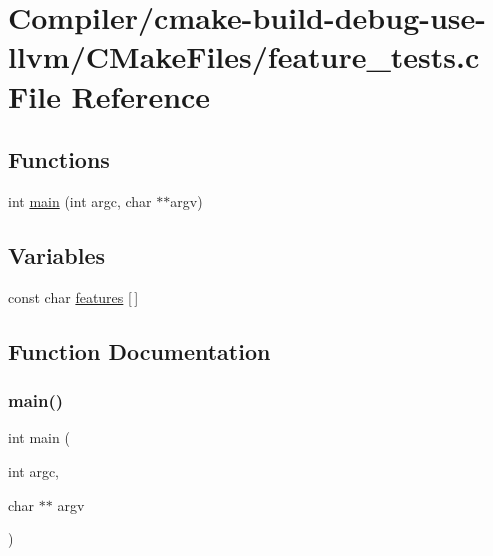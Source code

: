 \hypertarget{_compiler_2cmake-build-debug-use-llvm_2_c_make_files_2feature__tests_8c}{}\section{Compiler/cmake-\/build-\/debug-\/use-\/llvm/\+C\+Make\+Files/feature\+\_\+tests.c File Reference}
\label{_compiler_2cmake-build-debug-use-llvm_2_c_make_files_2feature__tests_8c}
\subsection*{Functions}
\begin{DoxyCompactItemize}
\item 
int \mbox{\hyperlink{_compiler_2cmake-build-debug-use-llvm_2_c_make_files_2feature__tests_8c_a3c04138a5bfe5d72780bb7e82a18e627}{main}} (int argc, char $\ast$$\ast$argv)
\end{DoxyCompactItemize}
\subsection*{Variables}
\begin{DoxyCompactItemize}
\item 
const char \mbox{\hyperlink{_compiler_2cmake-build-debug-use-llvm_2_c_make_files_2feature__tests_8c_a1582568e32f689337602a16bf8a5bff0}{features}} \mbox{[}$\,$\mbox{]}
\end{DoxyCompactItemize}


\subsection{Function Documentation}
\mbox{\label{_compiler_2cmake-build-debug-use-llvm_2_c_make_files_2feature__tests_8c_a3c04138a5bfe5d72780bb7e82a18e627}} 
\subsubsection{\texorpdfstring{main()}{main()}}
{\footnotesize\ttfamily int main (\begin{DoxyParamCaption}\item[{int}]{argc,  }\item[{char $\ast$$\ast$}]{argv }\end{DoxyParamCaption})}



